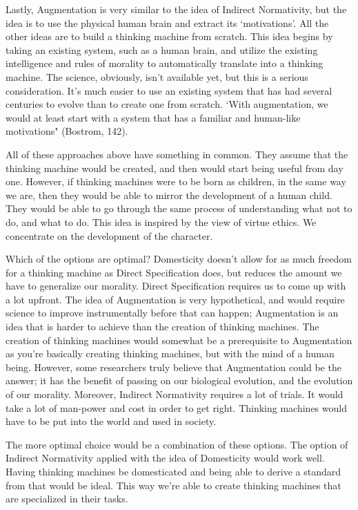 \documentclass[11pt, oneside]{article}
\begin{document}
\par Lastly, Augmentation is very similar to the idea of Indirect Normativity, but the idea is to use the physical human brain and extract its `motivations'. All the other ideas are to build a thinking machine from scratch. This idea begins by taking an existing system, such as a human brain, and utilize the existing intelligence and rules of morality to automatically translate into a thinking machine. The science, obviously, isn't available yet, but this is a serious consideration. It's much easier to use an existing system that has had several centuries to evolve than to create one from scratch. `With augmentation, we would at least start with a system that has a familiar and human-like motivations" (Bostrom, 142). 

\par All of these approaches above have something in common. They assume that the thinking machine would be created, and then would start being useful from day one. However, if thinking machines were to be born as children, in the same way we are, then they would be able to mirror the development of a human child. They would be able to go through the same process of understanding what not to do, and what to do. This idea is inspired by the view of virtue ethics. We concentrate on the development of the character.

\par 
Which of the options are optimal? 
Domesticity doesn't allow for as much freedom for a thinking machine as Direct Specification does, but reduces the amount we have to generalize our morality. Direct Specification requires us to come up with a lot upfront. 
The idea of Augmentation is very hypothetical, and would require science to improve instrumentally before that can happen; Augmentation is an idea that is harder to achieve than the creation of thinking machines. The creation of thinking machines would somewhat be a prerequisite to Augmentation as you're basically creating thinking machines, but with the mind of a human being. However, some researchers truly believe that Augmentation could be the answer; it has the benefit of passing on our biological evolution, and the evolution of our morality.
Moreover, Indirect Normativity requires a lot of trials. It would take a lot of man-power and cost in order to get right. Thinking machines would have to be put into the world and used in society.
\par The more optimal choice would be a combination of these options. The option of Indirect Normativity applied with the idea of Domesticity would work well. Having thinking machines be domesticated and being able to derive a standard from that would be ideal. This way we're able to create thinking machines that are specialized in their tasks. 
\end{document}
